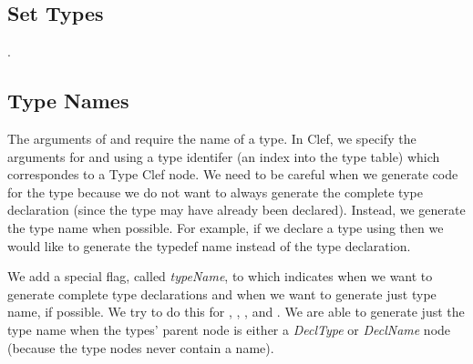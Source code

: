 \subsection{Set Types}

.


\subsection{Type Names}

The arguments of  and  require the name of a
type.
In Clef, we specify the arguments for  and  using
a type identifer (\ie an index into the type table) which correspondes
to a Type Clef node.  We need to be careful when we generate code for
the type because we do not want to always generate the complete type
declaration (since the type may have already been declared).
Instead, we generate the type name when possible.  For
example, if we declare a type using  then we would
like to generate the typedef name instead of the type declaration.

We add a special flag, called \textit{typeName}, to  which
indicates when we want to generate complete type declarations and when
we want to generate just type name, if possible.  We try to do this
for , , , and .  We
are able to generate just the type name when the types' parent node is
either a \textit{DeclType} or \textit{DeclName} node (because the type
nodes never contain a name).







